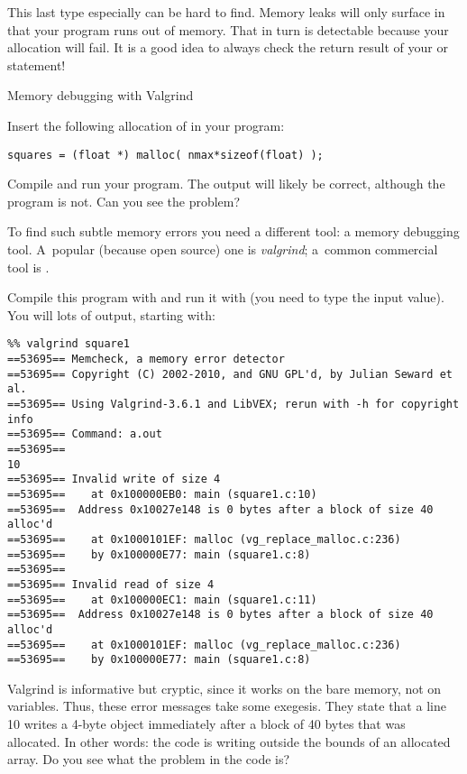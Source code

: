 This last type especially can be hard to find.
Memory leaks will only surface in that your program runs out of
  memory. That in turn is detectable because your allocation will
  fail. It is a good idea to always check the return result of your
   or  statement!

 {Memory debugging with Valgrind}
\label{sec:valgrind}

Insert the following allocation of  in your program:
\begin{verbatim}
squares = (float *) malloc( nmax*sizeof(float) );
\end{verbatim}
Compile and run your program. The output will likely be correct,
although the program is not. Can you see the problem?


To find such subtle memory errors you need a different tool: a memory
debugging tool. A~popular (because open source) one is
\emph{valgrind}; a~common commercial tool is .


Compile this program with  and run it with
 (you need to type the input value). You will lots
of output, starting with:
{\small
\begin{verbatim}
%% valgrind square1
==53695== Memcheck, a memory error detector
==53695== Copyright (C) 2002-2010, and GNU GPL'd, by Julian Seward et al.
==53695== Using Valgrind-3.6.1 and LibVEX; rerun with -h for copyright info
==53695== Command: a.out
==53695== 
10
==53695== Invalid write of size 4
==53695==    at 0x100000EB0: main (square1.c:10)
==53695==  Address 0x10027e148 is 0 bytes after a block of size 40 alloc'd
==53695==    at 0x1000101EF: malloc (vg_replace_malloc.c:236)
==53695==    by 0x100000E77: main (square1.c:8)
==53695== 
==53695== Invalid read of size 4
==53695==    at 0x100000EC1: main (square1.c:11)
==53695==  Address 0x10027e148 is 0 bytes after a block of size 40 alloc'd
==53695==    at 0x1000101EF: malloc (vg_replace_malloc.c:236)
==53695==    by 0x100000E77: main (square1.c:8)
\end{verbatim}
}
Valgrind is informative but cryptic, since it works on the bare
memory, not on variables. Thus, these error messages take some
exegesis. They state that a line 10 writes a 4-byte object immediately
after a block of 40 bytes that was allocated. In other words: the code
is writing outside the bounds of an allocated array. Do you see what
the problem in the code is?

